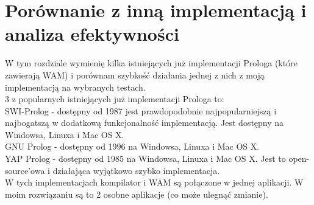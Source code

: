 \chapter{Porównanie z inną implementacją i analiza efektywności}
\thispagestyle{chapterBeginStyle}

\iffalse
W tym rozdziale należy przedstawić analizę zagadnienia, które podlega informatyzacji. Należy zidentyfikować i opisać obiekty składowe rozważanego wycinka rzeczywistości i ich wzajemne relacje (np.\ użytkowników systemu i ich role). Należy szczegółowo omówić procesy jakie zachodzą w systemie i które będą informatyzowane, takie jak np.\ przepływ dokumentów.
Należy sprecyzować i wypunktować założenia funkcjonalne i poza funkcjonalne dla projektowanego systemu.
Jeśli istnieją aplikacje realizujące dowolny podzbiór zadanych funkcjonalności realizowanego systemu należy przeprowadzić ich analizę porównawczą, wskazując na różnice bądź innowacyjne elementy, które projektowany w pracy system informatyczny będzie zawierał.
Należy odnieść się do uwarunkowań prawnych związanych z procesami przetwarzania danych w projektowanym systemie.
Jeśli zachodzi konieczność, należy wprowadzić i omówić model matematyczny elementów systemu na odpowiednim poziomie abstrakcji.

{\color{dgray}
W niniejszym rozdziale omówiono koncepcję architektury programowej systemu \ldots. W
szczególny sposób \ldots. Omówiono założenia funkcjonalne i niefunkcjonalne podsystemów \ldots. Przedstawiono
mechanizmy \ldots. Sklasyfikowano systemy ze względu na \ldots. Omówiono istniejące rozwiązania informatyczne o podobnej funkcjonalności \ldots (zobacz \cite{JCINodesChord}).
}
\fi

W tym rozdziale wymienię kilka istniejących już implementacji Prologa (które zawierają WAM) i porównam szybkość działania jednej z nich z moją implementacją na wybranych testach.\\
3 z popularnych istniejących już implementacji Prologa to:\\
SWI-Prolog - dostępny od 1987 jest prawdopodobnie najpopularniejszą i najbogatszą w dodatkową funkcjonalność implementacją. Jest dostępny na Windowsa, Linuxa i Mac OS X.\\
GNU Prolog - dostępny od 1996 na Windowsa, Linuxa i Mac OS X.\\
YAP Prolog - dostępny od 1985 na Windowsa, Linuxa i Mac OS X. Jest to open-source'owa i działająca wyjątkowo szybko implementacja.\\
W tych implementacjach kompilator i WAM są połączone w jednej aplikacji. W moim rozwiązaniu są to 2 osobne aplikacje (co może ulegnąć zmianie).